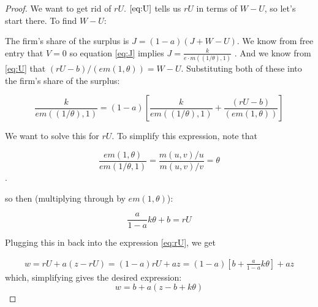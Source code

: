 \documentclass[12pt]{article}
\begin{document}
\begin{proof}
We want to get rid of $rU$.   $\eqref{eq:U}$ tells us $rU$   in terms of $W - U$, so let's start there.   To find $W - U$: 
 
 The firm's share of the surplus is $J = (1-a) (J + W - U)$.  We know from free entry that  $V = 0$ so equation \eqref{eq:J} implies $J = \frac{k}{e \cdot m((1/\theta),1)}$ .    And we know from \eqref{eq:U} that $ (rU - b)/(em(1,\theta)) = W - U$.  Substituting both of these into the firm's share of the surplus: 
 
 
$$ \frac{k}{e  m((1/\theta),1)} = (1-a)  \left[\frac{k}{e  m((1/\theta),1)} + \frac{ (rU - b)}{(em(1,\theta))} \right]  $$


We want to solve this for $rU$.  To simplify this expression, note that  

$$ \frac{e m(1,\theta)}{e m(1/\theta,1)} = \frac{ m(u,v)/u}{m(u,v)/v} = \theta$$.   

so then (multiplying through by $em(1,\theta)$):

$$ \frac{a}{1-a} k \theta + b = rU$$

Plugging this in back into the expression \eqref{eq:rU}, we get

\begin{equation*}
	\begin{aligned}
		w = rU + a (z - r U) = (1-a) rU + a z = (1-a) \left[b + \frac{a}{1-a} k \theta \right]  + a z
	\end{aligned}
\end{equation*}
which, simplifying gives the desired expression:
\begin{equation*}
	w = b + a (z - b +  k \theta)
\end{equation*}

\end{proof}
\end{document}
